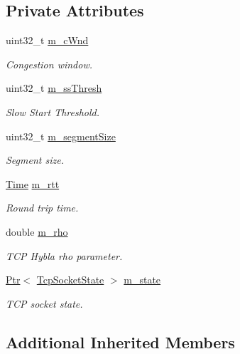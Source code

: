 \subsection*{Private Attributes}
\begin{DoxyCompactItemize}
\item 
uint32\+\_\+t \hyperlink{classTcpHyblaIncrementTest_a1cc57b61ad36bc6ac3e30c9d856ac7c3}{m\+\_\+c\+Wnd}
\begin{DoxyCompactList}\small\item\em Congestion window. \end{DoxyCompactList}\item 
uint32\+\_\+t \hyperlink{classTcpHyblaIncrementTest_a74b5f18cddac7c9bb6d88b3891d86f03}{m\+\_\+ss\+Thresh}
\begin{DoxyCompactList}\small\item\em Slow Start Threshold. \end{DoxyCompactList}\item 
uint32\+\_\+t \hyperlink{classTcpHyblaIncrementTest_a5219f317f34add20fc1850a49ba89e5f}{m\+\_\+segment\+Size}
\begin{DoxyCompactList}\small\item\em Segment size. \end{DoxyCompactList}\item 
\hyperlink{classns3_1_1Time}{Time} \hyperlink{classTcpHyblaIncrementTest_ad472aca77f133ebf3dd2034d30e0148e}{m\+\_\+rtt}
\begin{DoxyCompactList}\small\item\em Round trip time. \end{DoxyCompactList}\item 
double \hyperlink{classTcpHyblaIncrementTest_afbdfbaf9911a29b5819f548c1195f5e0}{m\+\_\+rho}
\begin{DoxyCompactList}\small\item\em T\+CP Hybla rho parameter. \end{DoxyCompactList}\item 
\hyperlink{classns3_1_1Ptr}{Ptr}$<$ \hyperlink{classns3_1_1TcpSocketState}{Tcp\+Socket\+State} $>$ \hyperlink{classTcpHyblaIncrementTest_a7bdef0a2b0654dcf180e3a219a93f6e2}{m\+\_\+state}
\begin{DoxyCompactList}\small\item\em T\+CP socket state. \end{DoxyCompactList}\end{DoxyCompactItemize}
\subsection*{Additional Inherited Members}



